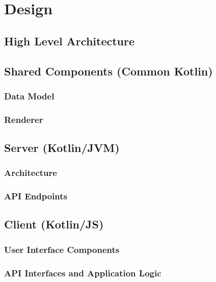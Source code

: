 \chapter{Design}
\label{chap:design}
\section{High Level Architecture}
\label{sec:high-level-architecture}
\section{Shared Components (Common Kotlin)}
\label{sec:shared-components-common-kotlin}
\subsection{Data Model}
\label{ssec:data-model}
\subsection{Renderer}
\label{ssec:renderer}
\section{Server (Kotlin/JVM)}
\label{sec:server-kotlin-jvm}
\subsection{Architecture}
\label{ssec:architecture}
\subsection{API Endpoints}
\label{ssec:api-endpoints}
\section{Client (Kotlin/JS)}
\label{sec:client-kotlin-js}
\subsection{User Interface Components}
\label{ssec:user-interface-components}
\subsection{API Interfaces and Application Logic}
\label{ssec:api-interfaces-and-application-logic}
